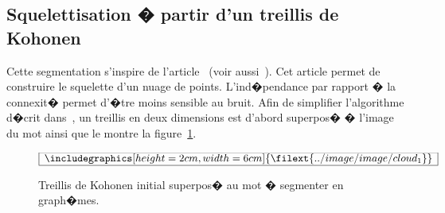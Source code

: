 \subsection{Squelettisation � partir d'un treillis de Kohonen}

Cette segmentation s'inspire de l'article~ (voir aussi~). Cet article permet de construire le squelette d'un nuage de points. L'ind�pendance par rapport � la connexit� permet d'�tre moins sensible au bruit. Afin de simplifier l'algorithme d�crit dans~, un treillis en deux dimensions est d'abord superpos� � l'image du mot ainsi que le montre la figure~\ref{image_grapheme_kohonen1}.


            \begin{figure}[ht]
        $$\frame{$\begin{array}[c]{c}\includegraphics[height=2cm, width=6cm]
        {\filext{../image/image/cloud_1}}\end{array}$}$$
        \caption{    Treillis de Kohonen initial superpos� au mot � segmenter en graph�mes.}
        \label{image_grapheme_kohonen1}
            \end{figure}


